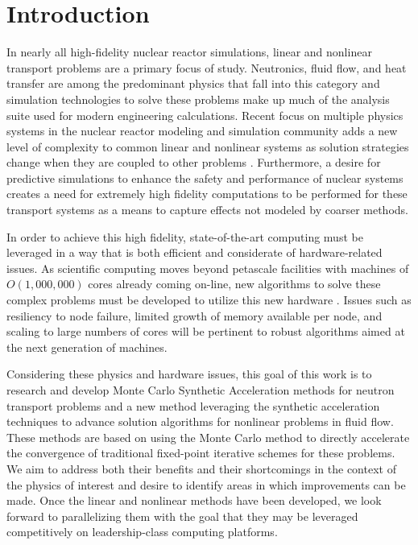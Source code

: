 \chapter{Introduction}
\label{ch:introduction}
In nearly all high-fidelity nuclear reactor simulations, linear and
nonlinear transport problems are a primary focus of study. Neutronics,
fluid flow, and heat transfer are among the predominant physics that
fall into this category and simulation technologies to solve these
problems make up much of the analysis suite used for modern
engineering calculations. Recent focus on multiple physics systems in
the nuclear reactor modeling and simulation community adds a new level
of complexity to common linear and nonlinear systems as solution
strategies change when they are coupled to other problems
\cite{u.s._department_of_energy_casl_2011}. Furthermore, a desire for
predictive simulations to enhance the safety and performance of
nuclear systems creates a need for extremely high fidelity
computations to be performed for these transport systems as a means to
capture effects not modeled by coarser methods.

In order to achieve this high fidelity, state-of-the-art computing
 must be leveraged in a way that is both efficient
and considerate of hardware-related issues. As scientific computing
moves beyond petascale facilities with machines of $O(1,000,000)$
cores already coming on-line, new algorithms to solve these complex
problems must be developed to utilize this new hardware
\cite{kogge_using_2011}. Issues such as resiliency to node failure,
limited growth of memory available per node, and scaling to large
numbers of cores will be pertinent to robust algorithms aimed at the
next generation of machines.

Considering these physics and hardware issues, this goal of this work
is to research and develop Monte Carlo Synthetic Acceleration methods
for neutron transport problems and a new method leveraging the
synthetic acceleration techniques to advance solution algorithms for
nonlinear problems in fluid flow. These methods are based on using the
Monte Carlo method to directly accelerate the convergence of
traditional fixed-point iterative schemes for these problems. We aim
to address both their benefits and their shortcomings in the context
of the physics of interest and desire to identify areas in which
improvements can be made. Once the linear and nonlinear methods have
been developed, we look forward to parallelizing them with the goal
that they may be leveraged competitively on leadership-class computing
platforms.

